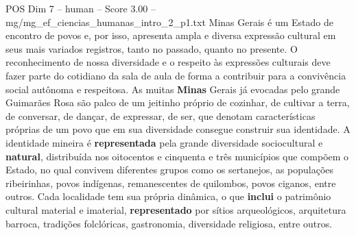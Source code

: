 \begin{textsample}{POS Dim 7 – human – Score 3.00 – mg/mg\_ef\_ciencias\_humanas\_intro\_2\_p1.txt}  \label{ex:f7_pos_018}
Minas Gerais é um Estado de encontro de povos e, por isso, apresenta ampla e diversa expressão cultural em seus mais variados registros, tanto no passado, quanto no presente.
O reconhecimento de nossa diversidade e o respeito às expressões culturais deve fazer parte do cotidiano da sala de aula de forma a contribuir para a convivência social autônoma e respeitosa.
As muitas \textbf{Minas} Gerais já evocadas pelo grande Guimarães Rosa são palco de um jeitinho próprio de cozinhar, de cultivar a terra, de conversar, de dançar, de expressar, de ser, que denotam características próprias de um povo que em sua diversidade consegue construir sua identidade.
A identidade mineira é \textbf{representada} pela grande diversidade sociocultural e \textbf{natural}, distribuída nos oitocentos e cinquenta e três municípios que compõem o Estado, no qual convivem diferentes grupos como os sertanejos, as populações ribeirinhas, povos indígenas, remanescentes de quilombos, povos ciganos, entre outros.
Cada localidade tem sua própria dinâmica, o que \textbf{inclui} o patrimônio cultural material e imaterial, \textbf{representado} por sítios arqueológicos, arquitetura barroca, tradições folclóricas, gastronomia, diversidade religiosa, entre outros.

\end{textsample}
